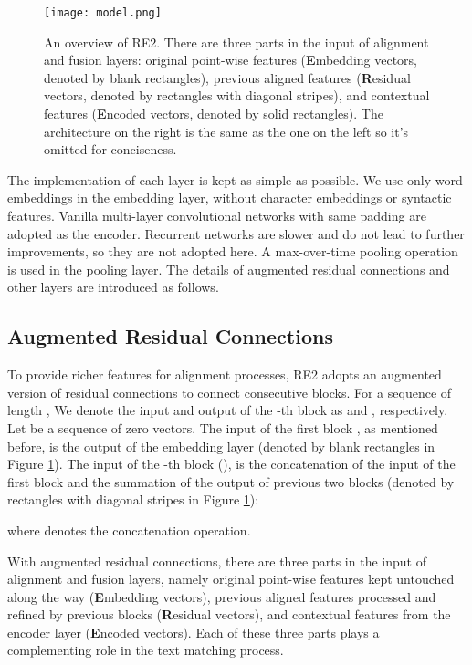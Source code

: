 \documentclass[11pt,a4paper]{article}
\begin{document}
\begin{figure}
  \texttt{[image: model.png]}  \caption{An overview of RE2. There are three parts in the input of alignment and fusion layers: original point-wise features (\textbf{E}mbedding vectors, denoted by blank rectangles), previous aligned features (\textbf{R}esidual vectors, denoted by rectangles with diagonal stripes), and contextual features (\textbf{E}ncoded vectors, denoted by solid rectangles). The architecture on the right is the same as the one on the left so it's omitted for conciseness.}
  \label{fig:model}
\end{figure}

The implementation of each layer is kept as simple as possible.
We use only word embeddings in the embedding layer, without character embeddings or syntactic features. Vanilla multi-layer convolutional networks with same padding \cite{collobert2011natural} are adopted as the encoder. Recurrent networks are slower and do not lead to further improvements, so they are not adopted here. A max-over-time pooling operation \cite{collobert2011natural} is used in the pooling layer. The details of augmented residual connections and other layers are introduced as follows.

\subsection{Augmented Residual Connections} \label{sec:a-res}
To provide richer features for alignment processes, RE2 adopts an augmented version of residual connections to connect consecutive blocks. 
For a sequence of length , We denote the input and output of the -th block as  and , respectively. Let  be a sequence of zero vectors.
The input of the first block , as mentioned before, is the output of the embedding layer (denoted by blank rectangles in Figure \ref{fig:model}). 
The input of the -th block  (), is the concatenation of the input of the first block  and the summation of the output of previous two blocks (denoted by rectangles with diagonal stripes in Figure \ref{fig:model}):


where  denotes the concatenation operation.

With augmented residual connections, there are three parts in the input of alignment and fusion layers, namely original point-wise features kept untouched along the way (\textbf{E}mbedding vectors), previous aligned features processed and refined by previous blocks (\textbf{R}esidual vectors), and contextual features from the encoder layer (\textbf{E}ncoded vectors). Each of these three parts plays a complementing role in the text matching process. 
\end{document}
